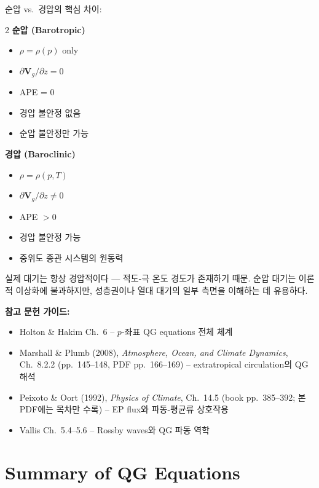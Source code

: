 \begin{hisublock}
순압 vs.\ 경압의 핵심 차이:
\begin{multicols}{2}
\textbf{순압 (Barotropic)}
\begin{itemize}
  \item $\rho = \rho(p)$ only
  \item $\partial\mathbf{V}_g/\partial z = 0$
  \item APE = 0
  \item 경압 불안정 없음
  \item 순압 불안정만 가능
\end{itemize}
\columnbreak
\textbf{경압 (Baroclinic)}
\begin{itemize}
  \item $\rho = \rho(p, T)$
  \item $\partial\mathbf{V}_g/\partial z \neq 0$
  \item APE $> 0$
  \item 경압 불안정 가능
  \item 중위도 종관 시스템의 원동력
\end{itemize}
\end{multicols}
실제 대기는 항상 경압적이다 --- 적도-극 온도 경도가 존재하기 때문.
순압 대기는 이론적 이상화에 불과하지만, 성층권이나 열대 대기의 일부 측면을
이해하는 데 유용하다.
\end{hisublock}

\begin{hisublock}
\textbf{참고 문헌 가이드:}
\begin{itemize}
  \item Holton \& Hakim Ch.~6 -- $p$-좌표 QG equations 전체 체계
  \item Marshall \& Plumb (2008), \textit{Atmosphere, Ocean, and Climate Dynamics}, Ch.~8.2.2 (pp.~145--148, PDF pp.~166--169) -- extratropical circulation의 QG 해석
  \item Peixoto \& Oort (1992), \textit{Physics of Climate}, Ch.~14.5 (book pp.~385--392; 본 PDF에는 목차만 수록) -- EP flux와 파동-평균류 상호작용
  \item Vallis Ch.~5.4--5.6 -- Rossby waves와 QG 파동 역학
\end{itemize}
\end{hisublock}


\section{Summary of QG Equations}\label{sec:qg-summary}

